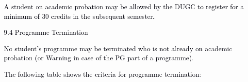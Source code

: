\documentclass[12pt]{article}
\begin{document}

\par 

\vspace{\baselineskip}
\begin{adjustwidth}{0.07in}{0.29in}
{\fontsize{10pt}{12.0pt}\selectfont \textcolor[HTML]{00000A}{A student on academic probation may be allowed by the DUGC to register for a minimum of 30 credits in the subsequent semester.}\par}\par

\end{adjustwidth}


\vspace{\baselineskip}
\begin{adjustwidth}{0.07in}{0.0in}
\textcolor[HTML]{00000A}{9.4 Programme Termination}\par

\end{adjustwidth}


\vspace{\baselineskip}
\begin{adjustwidth}{0.07in}{0.08in}
{\fontsize{10pt}{12.0pt}\selectfont \textcolor[HTML]{00000A}{No student's programme may be terminated who is not already on academic probation (or Warning in case of the PG part of a programme).}\par}\par

\end{adjustwidth}


\vspace{\baselineskip}
\begin{adjustwidth}{0.07in}{0.0in}
{\fontsize{10pt}{12.0pt}\selectfont \textcolor[HTML]{00000A}{The following table shows the criteria for programme termination:}\par}\par

\end{adjustwidth}


\vspace{\baselineskip}
\end{document}
